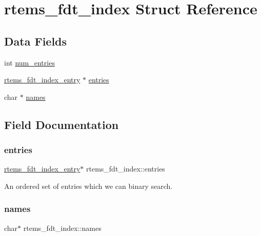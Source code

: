 \hypertarget{structrtems__fdt__index}{}\section{rtems\+\_\+fdt\+\_\+index Struct Reference}
\label{structrtems__fdt__index}
\subsection*{Data Fields}
\begin{DoxyCompactItemize}
\item 
int \mbox{\hyperlink{structrtems__fdt__index_aab8d87f0d4e15e6d27c984cf8279ad47}{num\+\_\+entries}}
\item 
\mbox{\hyperlink{structrtems__fdt__index__entry}{rtems\+\_\+fdt\+\_\+index\+\_\+entry}} $\ast$ \mbox{\hyperlink{structrtems__fdt__index_a358ec436339ae82c995bf484bd5a44e5}{entries}}
\item 
char $\ast$ \mbox{\hyperlink{structrtems__fdt__index_ac429f7d647d76b3e7f1ef2225ab9288a}{names}}
\end{DoxyCompactItemize}


\subsection{Field Documentation}
\mbox{\label{structrtems__fdt__index_a358ec436339ae82c995bf484bd5a44e5}} 
\subsubsection{\texorpdfstring{entries}{entries}}
{\footnotesize\ttfamily \mbox{\hyperlink{structrtems__fdt__index__entry}{rtems\+\_\+fdt\+\_\+index\+\_\+entry}}$\ast$ rtems\+\_\+fdt\+\_\+index\+::entries}

An ordered set of entries which we can binary search. \mbox{\label{structrtems__fdt__index_ac429f7d647d76b3e7f1ef2225ab9288a}} 
\subsubsection{\texorpdfstring{names}{names}}
{\footnotesize\ttfamily char$\ast$ rtems\+\_\+fdt\+\_\+index\+::names}

